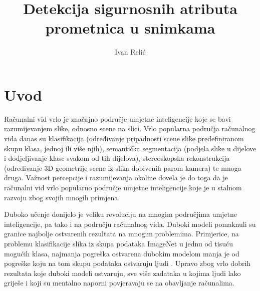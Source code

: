 \documentclass[times, utf8, diplomski, numeric]{fer}
\begin{document}
\nocite{*}


\title{Detekcija sigurnosnih atributa prometnica u snimkama}

\author{Ivan Relić}

\maketitle




\tableofcontents

\chapter{Uvod}
Računalni vid vrlo je značajno područje umjetne inteligencije koje se bavi razumijevanjem slike, odnosno scene na slici. 
Vrlo popularna područja računalnog vida danas su klasifikacija (određivanje pripadnosti scene slike predefiniranom skupu klasa, jednoj ili više njih), semantička segmentacija (podjela slike u dijelove i dodjeljivanje klase svakom od tih dijelova), stereoskopska rekonstrukcija (određivanje 3D geometrije scene iz slika dobivenih parom kamera) te mnoga druga.
Važnost percepcije i razumijevanja okoline dovela je do toga da je računalni vid vrlo popularno područje umjetne inteligencije koje je u stalnom razvoju zbog svojih mnogih primjena.

Duboko učenje donijelo je veliku revoluciju na mnogim područjima umjetne inteligencije, pa tako i na području računalnog vida. 
Duboki modeli pomaknuli su granice najbolje ostvarenih rezultata na mnogim problemima. 
Primjerice,  na problemu klasifikacije slika iz skupa podataka ImageNet \citep{dataset:imagenet} u jednu od tisuću mogućih klasa, najmanja pogreška ostvarena dubokim modelom manja je od pogreške koju na tom skupu podataka ostvaruju ljudi \citep{article:delving_deep_into_rectifiers}. 
Upravo zbog vrlo dobrih rezultata koje duboki modeli ostvaruju, sve više zadataka u kojima ljudi lako griješe i koji su mentalno naporni povjeravaju se na obavljanje računalima.
\end{document}
